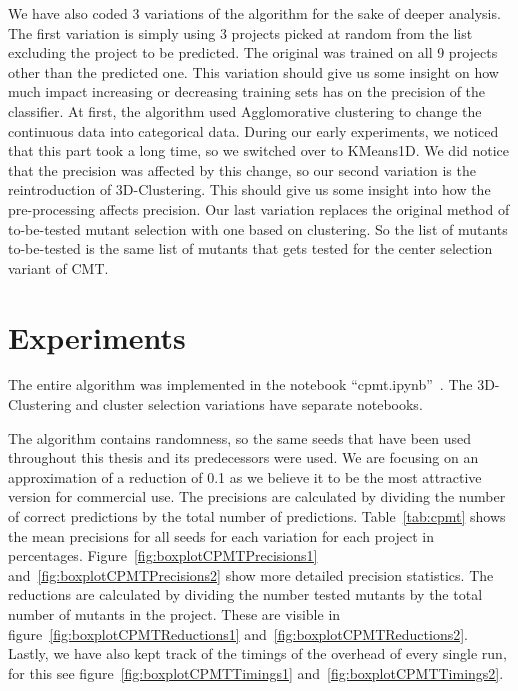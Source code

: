 \documentclass[twoside]{uva-inf-bachelor-thesis}
\begin{document}
We have also coded 3 variations of the algorithm for the sake of deeper analysis. The first variation is simply using 3 projects picked at random from the list excluding the project to be predicted. The original was trained on all 9 projects other than the predicted one. This variation should give us some insight on how much impact increasing or decreasing training sets has on the precision of the classifier. At first, the algorithm used Agglomorative clustering to change the continuous data into categorical data. During our early experiments, we noticed that this part took a long time, so we switched over to KMeans1D. We did notice that the precision was affected by this change, so our second variation is the reintroduction of 3D-Clustering. This should give us some insight into how the pre-processing affects precision. Our last variation replaces the original method of to-be-tested mutant selection with one based on clustering. So the list of mutants to-be-tested is the same list of mutants that gets tested for the center selection variant of CMT.

\section{Experiments}
The entire algorithm was implemented in the notebook ``cpmt.ipynb''~\cite{aAbdalla-repo}. The 3D-Clustering and cluster selection variations have separate notebooks.

The algorithm contains randomness, so the same seeds that have been used throughout this thesis and its predecessors were used. We are focusing on an approximation of a reduction of 0.1 as we believe it to be the most attractive version for commercial use. The precisions are calculated by dividing the number of correct predictions by the total number of predictions. Table~\ref{tab:cpmt} shows the mean precisions for all seeds for each variation for each project in percentages. Figure~\ref{fig:boxplotCPMTPrecisions1} and~\ref{fig:boxplotCPMTPrecisions2} show more detailed precision statistics. The reductions are calculated by dividing the number tested mutants by the total number of mutants in the project. These are visible in figure~\ref{fig:boxplotCPMTReductions1} and~\ref{fig:boxplotCPMTReductions2}. Lastly, we have also kept track of the timings of the overhead of every single run, for this see figure~\ref{fig:boxplotCPMTTimings1} and~\ref{fig:boxplotCPMTTimings2}.
\end{document}
